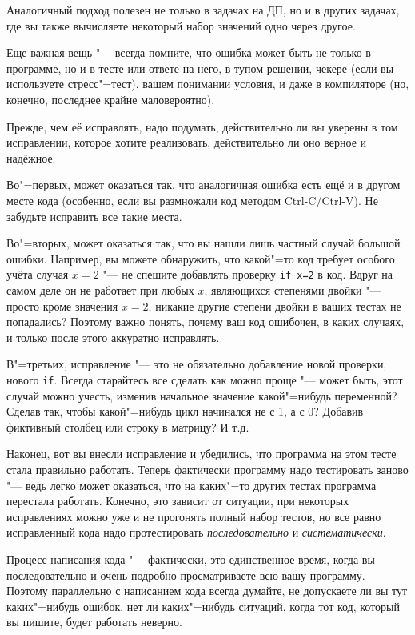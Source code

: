 Аналогичный подход полезен не только в задачах на ДП, но и в других задачах, где вы также вычисляете некоторый набор значений одно через другое.

Еще важная вещь "--- всегда помните, что ошибка может быть не только в программе, но и в тесте или ответе на него, в тупом решении,
чекере (если вы используете стресс"=тест), вашем понимании условия, и даже в компиляторе (но, конечно, последнее крайне маловероятно).

Прежде, чем её исправлять, надо подумать, действительно ли вы уверены в том исправлении, которое хотите реализовать, действительно ли оно верное и надёжное.

Во"=первых, может оказаться так, что аналогичная ошибка есть ещё и в другом месте кода (особенно, если вы размножали код методом Ctrl-C/Ctrl-V).
Не забудьте исправить все такие места.

Во"=вторых, может оказаться так, что вы нашли лишь частный случай большой ошибки. 
Например, вы можете обнаружить, что какой"=то код требует особого учёта случая $x=2$ "--- не спешите добавлять проверку \verb`if x=2` в код.
Вдруг на самом деле он не работает при любых $x$, являющихся степенями двойки "--- просто кроме значения $x=2$, никакие другие степени двойки
в ваших тестах не попадались? Поэтому важно понять, почему ваш код ошибочен, в каких случаях, и только после этого аккуратно исправлять.

В"=третьих, исправление "--- это не обязательно добавление новой проверки, нового \verb`if`. 
Всегда старайтесь все сделать как можно проще "--- может быть, этот случай можно учесть, изменив начальное значение какой"=нибудь переменной?
Сделав так, чтобы какой"=нибудь цикл начинался не с 1, а с 0? Добавив фиктивный столбец или строку в матрицу? И т.д.

Наконец, вот вы внесли исправление и убедились, что программа на этом тесте стала правильно работать.
Теперь фактически программу надо тестировать заново "--- ведь легко может оказаться, что на каких"=то других тестах программа перестала работать.
Конечно, это зависит от ситуации, при некоторых исправлениях можно уже и не прогонять полный набор тестов, но все равно исправленный кода надо
протестировать \textit{последовательно} и \textit{систематически}.


Процесс написания кода "--- фактически, это единственное время, когда вы последовательно и очень подробно просматриваете всю вашу программу.
Поэтому параллельно с написанием кода всегда думайте, не допускаете ли вы тут каких"=нибудь ошибок, нет ли каких"=нибудь ситуаций, 
когда тот код, который вы пишите, будет работать неверно.

